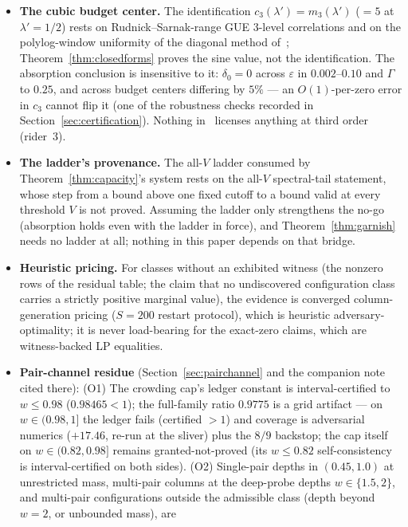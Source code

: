 \documentclass[11pt]{article}
\theoremstyle{plain}
\theoremstyle{definition}
\theoremstyle{remark}
\begin{document}
\begin{itemize}
\item \textbf{The cubic budget center.} The identification
  $c_3(\lambda') = m_3(\lambda')$ ($= 5$ at $\lambda' = 1/2$) rests on
  Rudnick--Sarnak-range GUE $3$-level correlations and on the polylog-window
  uniformity of the diagonal method of~\cite[\S5]{AF26};
  Theorem~\ref{thm:closedforms} proves the sine value, not the identification.
  The absorption conclusion is insensitive to it: $\delta_0 = 0$ across
  $\varepsilon$ in $0.002$--$0.10$ and $\Gamma$ to $0.25$, and across budget
  centers differing by $5\%$ --- an $O(1)$-per-zero error in $c_3$ cannot flip it
  (one of the robustness checks recorded in Section~\ref{sec:certification}).
  Nothing in~\cite{BGSTB24} licenses anything at third order (rider~3).
\item \textbf{The ladder's provenance.} The all-$V$ ladder consumed by
  Theorem~\ref{thm:capacity}'s system rests on the all-$V$ spectral-tail
  statement, whose step from a bound above one fixed cutoff to a bound valid at
  every threshold $V$ is not proved. Assuming the ladder only
  strengthens the no-go (absorption holds even with
  the ladder in force), and Theorem~\ref{thm:garnish} needs no ladder at all;
  nothing in this paper depends on that bridge.
\item \textbf{Heuristic pricing.} For classes without an exhibited witness (the
  nonzero rows of the residual table; the claim that no undiscovered
  configuration class carries a strictly positive marginal value), the evidence
  is converged column-generation pricing
  ($S = 200$ restart protocol), which is heuristic adversary-optimality; it is
  never load-bearing for the exact-zero claims, which are witness-backed LP
  equalities.
\item \textbf{Pair-channel residue} (Section~\ref{sec:pairchannel} and the
  companion note cited there): (O1) The crowding cap's
  ledger constant is interval-certified to $w \le 0.98$ ($0.98465 < 1$); the
  full-family ratio $0.9775$ is a grid artifact --- on
  $w \in (0.98, 1]$ the ledger fails (certified $> 1$) and coverage is
  adversarial numerics ($+17.46$, re-run at the sliver) plus the $8/9$ backstop;
  the cap itself on $w \in (0.82, 0.98]$ remains granted-not-proved (its
  $w \le 0.82$ self-consistency is interval-certified on both sides). (O2)
  Single-pair depths in $(0.45, 1.0)$ at unrestricted mass, multi-pair columns
  at the deep-probe depths $w \in \{1.5, 2\}$, and multi-pair configurations
  outside the admissible class (depth beyond $w = 2$, or unbounded mass), are

\end{itemize}
\end{document}
